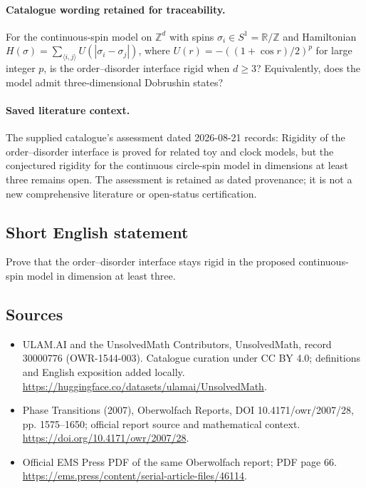 \documentclass[11pt]{article}
\begin{document}
\paragraph{Catalogue wording retained for traceability.}
For the continuous-spin model on $\mathbb Z^d$ with spins $\sigma_i\in S^1=\mathbb R/\mathbb Z$ and Hamiltonian $H(\sigma)=\sum_{\langle i,j\rangle}U(|\sigma_i-\sigma_j|)$, where $U(r)=-((1+\cos r)/2)^p$ for large integer $p$, is the order–disorder interface rigid when $d\geq3$? Equivalently, does the model admit three-dimensional Dobrushin states?

\paragraph{Saved literature context.} The supplied catalogue's assessment dated 2026-08-21 records: Rigidity of the order--disorder interface is proved for related toy and clock models, but the conjectured rigidity for the continuous circle-spin model in dimensions at least three remains open. The assessment is retained as dated provenance; it is not a new comprehensive literature or open-status certification.
\subsection{Short English statement}
Prove that the order--disorder interface stays rigid in the proposed continuous-spin model in dimension at least three.
\subsection{Sources}
\begin{itemize}
\item[\hypertarget{source:30000776:1}{S1}] ULAM.AI and the UnsolvedMath Contributors, UnsolvedMath, record 30000776 (OWR-1544-003). Catalogue curation under CC BY 4.0; definitions and English exposition added locally.
\url{https://huggingface.co/datasets/ulamai/UnsolvedMath}.
\item[\hypertarget{source:30000776:2}{S2}] Phase Transitions (2007), Oberwolfach Reports, DOI 10.4171/owr/2007/28, pp. 1575--1650; official report source and mathematical context.
\url{https://doi.org/10.4171/owr/2007/28}.
\item[\hypertarget{source:30000776:3}{S3}] Official EMS Press PDF of the same Oberwolfach report; PDF page 66.
\url{https://ems.press/content/serial-article-files/46114}.
\end{itemize}
\label{end:30000776}
\end{document}

